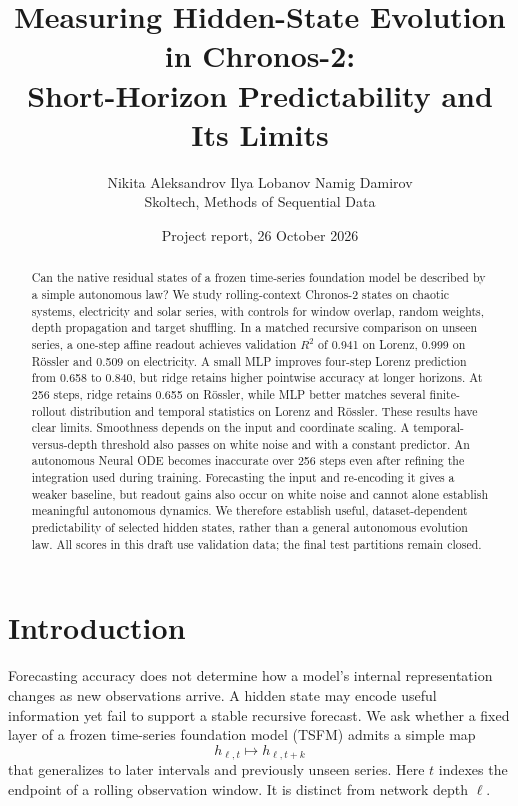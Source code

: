 \documentclass[10pt,a4paper,twocolumn]{article}
\title{\vspace{-8mm}Measuring Hidden-State Evolution in Chronos-2:\\
Short-Horizon Predictability and Its Limits}
\author{Nikita Aleksandrov \qquad Ilya Lobanov \qquad Namig Damirov\\
\small Skoltech, Methods of Sequential Data}
\date{\small Project report, 26 October 2026}
\begin{document}
\maketitle
\begin{abstract}
Can the native residual states of a frozen time-series foundation model be described by a simple autonomous law?
We study rolling-context Chronos-2 states on chaotic systems, electricity and solar series, with controls for window overlap, random weights, depth propagation and target shuffling.
In a matched recursive comparison on unseen series, a one-step affine readout achieves validation $R^2$ of 0.941 on Lorenz, 0.999 on R\"ossler and 0.509 on electricity.
A small MLP improves four-step Lorenz prediction from 0.658 to 0.840, but ridge retains higher pointwise accuracy at longer horizons.
At 256 steps, ridge retains 0.655 on R\"ossler, while MLP better matches several finite-rollout distribution and temporal statistics on Lorenz and R\"ossler.
These results have clear limits.
Smoothness depends on the input and coordinate scaling.
A temporal-versus-depth threshold also passes on white noise and with a constant predictor.
An autonomous Neural ODE becomes inaccurate over 256 steps even after refining the integration used during training.
Forecasting the input and re-encoding it gives a weaker baseline, but readout gains also occur on white noise and cannot alone establish meaningful autonomous dynamics.
We therefore establish useful, dataset-dependent predictability of selected hidden states, rather than a general autonomous evolution law.
All scores in this draft use validation data; the final test partitions remain closed.
\end{abstract}

\section{Introduction}
Forecasting accuracy does not determine how a model's internal representation changes as new observations arrive.
A hidden state may encode useful information yet fail to support a stable recursive forecast.
We ask whether a fixed layer of a frozen time-series foundation model (TSFM) admits a simple map
\begin{equation}
  h_{\ell,t}\longmapsto h_{\ell,t+k}
\end{equation}
that generalizes to later intervals and previously unseen series.
Here $t$ indexes the endpoint of a rolling observation window.
It is distinct from network depth $\ell$.
\end{document}
